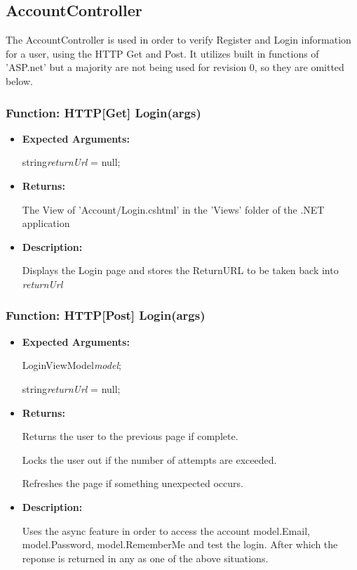 \documentclass{scrreprt}
\begin{document}
\subsection{AccountController}

The AccountController is used in order to verify Register and Login information
for a user, using the HTTP Get and Post. It utilizes built in functions of
'ASP.net' but a majority are not being used for revision 0, so they are omitted
below.

\subsubsection{Function: HTTP[Get] Login(args)}

\begin{itemize}
        \item \textbf{Expected Arguments:}

                string\quad\textit{returnUrl} = null;

        \item \textbf{Returns:}

                The View of 'Account/Login.cshtml' in the 'Views' folder of the
                .NET application

        \item \textbf{Description:}

                Displays the Login page and stores the ReturnURL to be taken
                back into \textit{returnUrl}
\end{itemize}

\subsubsection{Function: HTTP[Post] Login(args)}

\begin{itemize}
        \item \textbf{Expected Arguments:}

                LoginViewModel\quad\textit{model};

                string\quad\textit{returnUrl} = null;

        \item \textbf{Returns:}

                Returns the user to the previous page if complete.

                Locks the user out if the number of attempts are exceeded.

                Refreshes the page if something unexpected occurs.

        \item \textbf{Description:}

                Uses the async feature in order to access the account
                model.Email, model.Password, model.RememberMe and test the
                login. After which the reponse is returned in any as one of the
                above situations.

\end{itemize}
\end{document}
